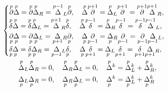 \begin{gather} 


\begin{cases} 


\up{p}{\partial}\up{p}{\Delta}=\up{p}{\partial} 


\up{p}{\Delta}_R=\up{p-1}{\Delta}_L\up{p}{\partial},\quad 


\up{p}{\Delta}\up{p+1}{\partial}=\up{p}{\Delta}_L 


\up{p+1}{\partial}=\up{p+1}{\partial}\up{p+1}{\Delta}_R, \\


% 


\up{p}{\delta}\up{p}{\Delta}=\up{p}{\delta} 


\up{p}{\Delta}_L=\up{p+1}{\Delta}_R\up{p}{\delta},\quad 


\up{p}{\Delta}\up{p-1}{\delta}=\up{p}{\Delta}_R 


\up{p-1}{\delta}=\up{p-1}{\delta}\up{p-1}{\Delta}_L, \\


% 


\down{p}{\partial}\down{p}{\Delta}=\down{p}{\partial} 


\down{p}{\Delta}_L=\down{p+1}{\Delta}_R\down{p}{\partial},\quad 


\down{p}{\Delta}\down{p-1}{\partial}=\down{p}{\Delta}_R 


\down{p-1}{\partial}=\down{p-1}{\partial}\down{p-1}{\Delta}_L, \\


% 


\down{p}{\delta}\down{p}{\Delta}=\down{p}{\delta} 


\down{p}{\Delta}_R=\down{p-1}{\Delta}_L\down{p}{\delta},\quad 


\down{p}{\Delta}\down{p+1}{\delta}=\down{p}{\Delta}_L 


\down{p+1}{\delta}=\down{p+1}{\delta}\down{p+1}{\Delta}_R,


\end{cases} 


\\


\begin{split} 


\up{p}{\Delta}_L\up{p}{\Delta}_R&=0,\quad  


\up{p}{\Delta}_R\up{p}{\Delta}_L=0,\quad 


\up{p}{\Delta}{}^k=\up{p}{\Delta}{}^k_L+ 


\up{p}{\Delta}{}^k_R, \\ 


% 


\down{p}{\Delta}_L\down{p}{\Delta}_R&=0,\quad  


\down{p}{\Delta}_R\down{p}{\Delta}_L=0,\quad 


\down{p}{\Delta}{}^k=\down{p}{\Delta}{}^k_L+ 


\down{p}{\Delta}{}^k_R


\end{split} 


\end{gather} 


